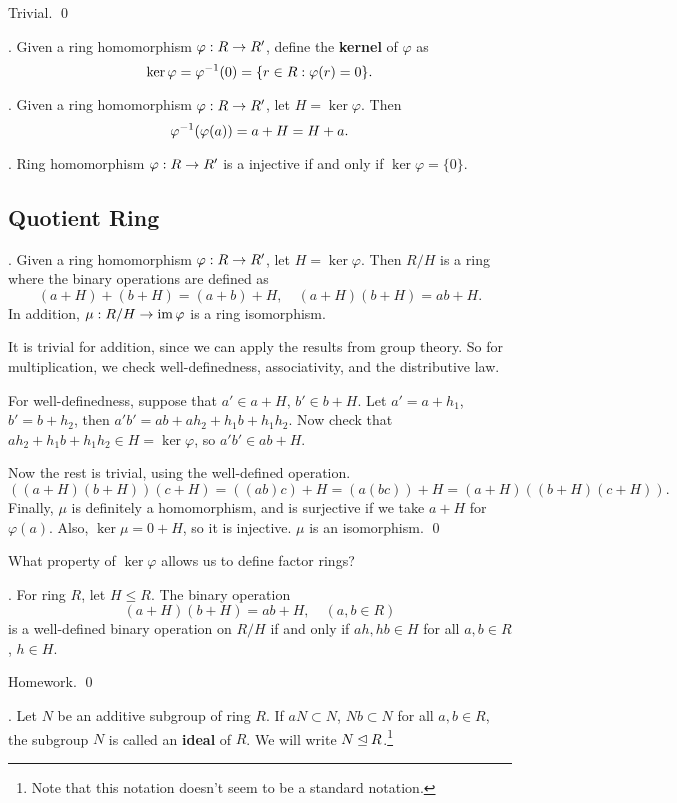 \pf Trivial. \qed

.  Given a ring homomorphism \(\varphi : R \rightarrow R'\), define the \textbf{kernel} of \(\varphi\) as
\[
    \ker \varphi = \varphi^{-1}(0) = \{r \in R : \varphi(r) = 0\}.
\]

\thm. Given a ring homomorphism \(\varphi : R \rightarrow R'\), let \(H = \ker\varphi\). Then
\[
    \varphi^{-1}(\varphi(a)) = a + H = H + a.
\]

\cor. Ring homomorphism \(\varphi : R \rightarrow R'\) is a injective if and only if \(\ker\varphi = \{0\}\).

\subsection*{Quotient Ring}

\thm. Given a ring homomorphism \(\varphi : R \rightarrow R'\), let \(H = \ker \varphi\). Then \(R / H\) is a ring where the binary operations are defined as
\[
    (a + H) + (b + H) = (a + b) + H, \quad (a + H)(b + H) = ab + H.
\]
In addition, \(\mu : R/H \rightarrow \operatorname{im} \varphi\) is a ring isomorphism.

\pf It is trivial for addition, since we can apply the results from group theory. So for multiplication, we check well-definedness, associativity, and the distributive law.

For well-definedness, suppose that \(a' \in a + H\), \(b' \in b + H\). Let \(a' = a + h_1\), \(b' = b + h_2\), then \(a'b' = ab + ah_2 + h_1b + h_1h_2\). Now check that \(ah_2 + h_1b + h_1h_2 \in H = \ker\varphi\), so \(a'b' \in ab + H\).

Now the rest is trivial, using the well-defined operation.
\[
    ((a + H)(b + H))(c + H) = ((ab)c) + H = (a(bc)) + H = (a + H)((b + H)(c + H)).
\]
Finally, \(\mu\) is definitely a homomorphism, and is surjective if we take \(a + H\) for \(\varphi(a)\). Also, \(\ker \mu = 0 + H\), so it is injective. \(\mu\) is an isomorphism. \qed

What property of \(\ker \varphi\) allows us to define factor rings?

\thm. For ring \(R\), let \(H \leq R\). The binary operation
\[
    (a + H)(b + H) = ab + H, \quad (a, b \in R)
\]
is a well-defined binary operation on \(R/H\) if and only if \(ah, hb \in H\) for all \(a, b \in R\), \(h \in H\).

\pf Homework. \qed

.  Let \(N\) be an additive subgroup of ring \(R\). If \(aN \subset N\), \(Nb \subset N\) for all \(a, b \in R\), the subgroup \(N\) is called an \textbf{ideal} of \(R\). We will write \(N \unlhd R\).\footnote{Note that this notation doesn't seem to be a standard notation.}

